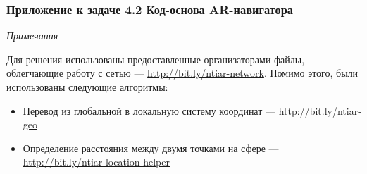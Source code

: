 \subsubsection*{Приложение к задаче 4.2 Код-основа AR-навигатора}

\textit{Примечания}

Для решения использованы предоставленные организаторами файлы, облегчающие работу с сетью — \url{http://bit.ly/ntiar-network}. Помимо этого, были использованы следующие алгоритмы:
\begin{itemize}
    \item Перевод из глобальной в локальную систему координат — \url{http://bit.ly/ntiar-geo}
    \item Определение расстояния между двумя точками на сфере — \url{http://bit.ly/ntiar-location-helper}
\end{itemize}